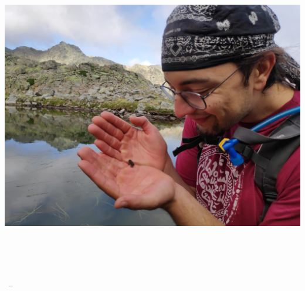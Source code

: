 \documentclass[twoside,openright,titlepage,numbers=noenddot,%
headinclude,footinclude,cleardoublepage=empty,abstract=on,
BCOR=5mm,fontsize=11pt, dvipsnames, paper=b5
]{scrreprt}
\begin{document}
\frenchspacing
\raggedbottom
{} %
\pagestyle{plain}

\thispagestyle{empty}
\begin{center}
    \spacedlowsmallcaps{\myName} \\ \medskip

    \begingroup
    \color{CTtitle}\spacedallcaps{\myTitle}\\ \bigskip
    \mySubtitle \\ \medskip
    \endgroup
\end{center}

\begin{titlepage}
    \begin{addmargin}[-1cm]{-3cm}
    \begin{center}
        \large

        \hfill

        \vfill

        \begingroup
        \color{CTtitle}\spacedallcaps{\myTitle} \\ \bigskip
        \mySubtitle \\ \medskip
        \endgroup

        \spacedlowsmallcaps{\myName}

        \vfill

        \includegraphics[width=0.7\linewidth]{gfx/froggy} \\ \medskip

        \myDepartment \\
        \myFaculty \\
        \myUni \\ \bigskip

        \myTime\ -- \myVersion

        \vfill

    \end{center}
  \end{addmargin}
\end{titlepage}
\end{document}
